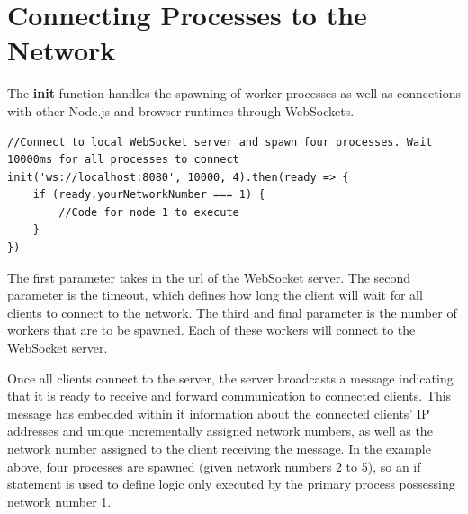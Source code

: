 \documentclass[12pt, a4paper]{report}
\theoremstyle{definition}
\theoremstyle{definition}%
\theoremstyle{definition}%
\theoremstyle{definition}%
\theoremstyle{definition}%
\theoremstyle{definition}%
\begin{document}
\section{Connecting Processes to the Network}
The \textbf{init} function handles the spawning of worker processes as well as connections with other Node.js and browser runtimes through WebSockets.
\begin{lstlisting}
//Connect to local WebSocket server and spawn four processes. Wait 10000ms for all processes to connect
init('ws://localhost:8080', 10000, 4).then(ready => {
    if (ready.yourNetworkNumber === 1) {
        //Code for node 1 to execute
    }
})
\end{lstlisting}
 
The first parameter takes in the url of the WebSocket server. The second parameter is the timeout, which defines how long the client will wait for all clients to connect to the network. The third and final parameter is the number of workers that are to be spawned. Each of these workers will connect to the WebSocket server.

Once all clients connect to the server, the server broadcasts a message indicating that it is ready to receive and forward communication to connected clients. This message has embedded within it information about the connected clients' IP addresses and unique incrementally assigned network numbers, as well as the network number assigned to the client receiving the message. In the example above, four processes are spawned (given network numbers 2 to 5), so an if statement is used to define logic only executed by the primary process possessing network number 1.
\end{document}
